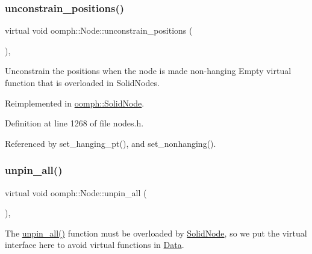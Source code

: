 \mbox{\label{classoomph_1_1Node_ac23aaa36891269f3c9a832618f0c8c2c}} 
\subsubsection{\texorpdfstring{unconstrain\+\_\+positions()}{unconstrain\_positions()}}
{\footnotesize\ttfamily virtual void oomph\+::\+Node\+::unconstrain\+\_\+positions (\begin{DoxyParamCaption}{ }\end{DoxyParamCaption})\hspace{0.3cm}{\ttfamily [inline]}, {\ttfamily [virtual]}}



Unconstrain the positions when the node is made non-\/hanging Empty virtual function that is overloaded in Solid\+Nodes. 



Reimplemented in \hyperlink{classoomph_1_1SolidNode_a1959abfbb37f775a4d6808ceb9afd421}{oomph\+::\+Solid\+Node}.



Definition at line 1268 of file nodes.\+h.



Referenced by set\+\_\+hanging\+\_\+pt(), and set\+\_\+nonhanging().

\mbox{\label{classoomph_1_1Node_a8ef38470acf00f344c9567bcc9cbd000}} 
\subsubsection{\texorpdfstring{unpin\+\_\+all()}{unpin\_all()}}
{\footnotesize\ttfamily virtual void oomph\+::\+Node\+::unpin\+\_\+all (\begin{DoxyParamCaption}{ }\end{DoxyParamCaption})\hspace{0.3cm}{\ttfamily [inline]}, {\ttfamily [virtual]}}



The \hyperlink{classoomph_1_1Node_a8ef38470acf00f344c9567bcc9cbd000}{unpin\+\_\+all()} function must be overloaded by \hyperlink{classoomph_1_1SolidNode}{Solid\+Node}, so we put the virtual interface here to avoid virtual functions in \hyperlink{classoomph_1_1Data}{Data}. 




